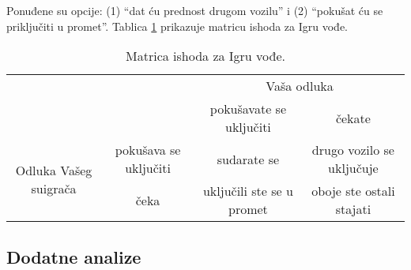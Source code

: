 \documentclass[a4paper, 12pt]{report}
\begin{document}
\begin{appendices}
Ponuđene su opcije: (1) \enquote{dat ću prednost drugom vozilu} i (2)
\enquote{pokušat ću se priključiti u promet}. Tablica \ref{ivtab} prikazuje matricu ishoda
za Igru vođe. 

\begin{table}[!h]
\centering 
    \caption{Matrica ishoda za Igru vođe.\label{ivtab}}
\hspace*{-0.5cm}\begin{tabular}{cccc}
\toprule[1pt]
    & & \multicolumn{2}{c}{Vaša odluka}\\
    & & pokušavate se uključiti& čekate\\
    \cmidrule[0.5pt]{3-4}
    \multirow{2}{*}{Odluka Vašeg suigrača} & pokušava se uključiti& sudarate se
    & drugo vozilo se uključuje  \\
    & čeka & uključili ste se u promet & oboje ste ostali stajati\\
	\bottomrule[1pt]
\end{tabular}
\end{table}

\clearpage
\subsection{Dodatne analize}


\end{appendices}
\end{document}
